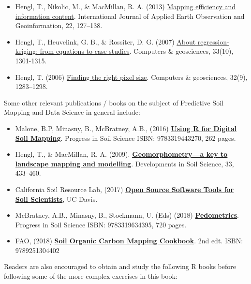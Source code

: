 \documentclass[graybox,natbib,nospthms]{svmono}
\begin{document}
\begin{itemize}
{  interpolation of soil water, temperature, and electrical conductivity
  in 3D+ T: The Cook Agronomy Farm data set}. Spatial Statistics, 14,
  70--90.
\item
  Hengl, T., Nikolic, M., \& MacMillan, R. A. (2013)
  \href{https://doi.org/10.1016/j.jag.2012.02.005}{Mapping efficiency
  and information content}. International Journal of Applied Earth
  Observation and Geoinformation, 22, 127--138.
\item
  Hengl, T., Heuvelink, G. B., \& Rossiter, D. G. (2007)
  \href{https://doi.org/10.1016/j.cageo.2007.05.001}{About
  regression-kriging: from equations to case studies}. Computers \&
  geosciences, 33(10), 1301-1315.
\item
  Hengl, T. (2006)
  \href{https://doi.org/10.1016/j.cageo.2005.11.008}{Finding the right
  pixel size}. Computers \& geosciences, 32(9), 1283--1298.
\end{itemize}

Some other relevant publications / books on the subject of Predictive
Soil Mapping and Data Science in general include:

\begin{itemize}
\item
  Malone, B.P, Minasny, B., McBratney, A.B., (2016)
  \href{https://www.springer.com/gp/book/9783319443256}{\textbf{Using R
  for Digital Soil Mapping}}. Progress in Soil Science ISBN:
  9783319443270, 262 pages.
\item
  Hengl, T., \& MacMillan, R. A. (2009).
  \href{https://doi.org/10.1016/S0166-2481(08)00019-6}{\textbf{Geomorphometry---a
  key to landscape mapping and modelling}}. Developments in Soil
  Science, 33, 433--460.
\item
  California Soil Resource Lab, (2017)
  \href{https://casoilresource.lawr.ucdavis.edu/software/}{\textbf{Open
  Source Software Tools for Soil Scientists}}, UC Davis.
\item
  McBratney, A.B., Minasny, B., Stockmann, U. (Eds) (2018)
  \href{https://www.springer.com/gp/book/9783319634371}{\textbf{Pedometrics}}.
  Progress in Soil Science ISBN: 9783319634395, 720 pages.
\item
  FAO, (2018)
  \href{https://github.com/FAO-GSP/SOC-Mapping-Cookbook}{\textbf{Soil
  Organic Carbon Mapping Cookbook}}. 2nd edt. ISBN: 9789251304402
\end{itemize}

Readers are also encouraged to obtain and study the following R books
before following some of the more complex exercises in this book:
\end{document}
